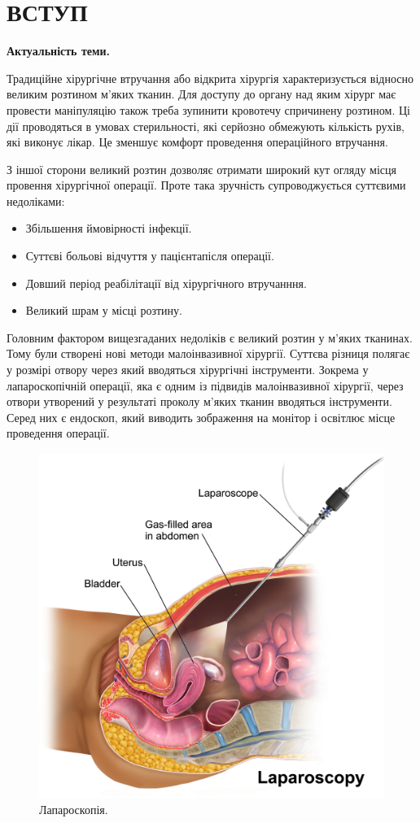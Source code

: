 \chapter{ВСТУП}

\nocite{bahvalov-et-al,benerdge-et-al} 

\textbf{Актуальність теми.}

Традиційне хірургічне втручання або відкрита хірургія характеризується відносно великим розтином м'яких тканин. Для 
доступу до органу над яким хірург має провести маніпуляцію також треба зупинити кровотечу спричинену розтином. Ці дії 
проводяться в умовах стерильності, які серйозно обмежують кількість рухів, які виконує лікар. Це зменшує комфорт 
проведення операційного втручання.

З іншої сторони великий розтин дозволяє отримати широкий кут огляду місця провення хірургічної операції. Проте така 
зручність супроводжується суттєвими недоліками:
\begin{itemize}
  \item Збільшення ймовірності інфекції.
  \item Суттєві больові відчуття у пацієнта після операції.
  \item Довший період реабілітації від хірургічного втручанння.
  \item Великий шрам у місці розтину.
\end{itemize}

Головним фактором вищезгаданих недоліків є великий розтин у м'яких тканинах. Тому були створені нові методи 
малоінвазивної хірургії. Суттєва різниця полягає у розмірі отвору через який вводяться хірургічні інструменти. 
Зокрема у лапароскопічній операції, яка є одним із підвидів малоінвазивної хірургії, через отвори утворений у результаті 
проколу м'яких тканин вводяться інструменти. Серед них є ендоскоп, який виводить зображення на монітор і освітлює місце 
проведення операції.

\begin{figure}[h!]
  \centering
  \includegraphics[width=0.4\linewidth]{images/intro_laparoscopy.png}
  \caption{Лапароскопія.}
  \label{fig:intro_laparoscopy}
\end{figure}

